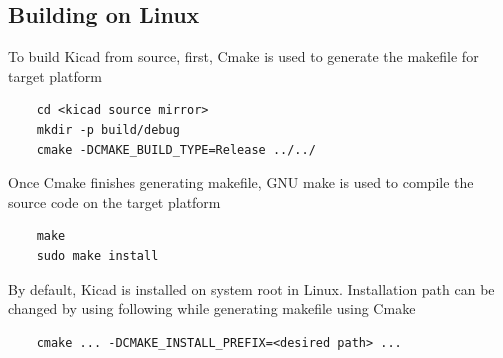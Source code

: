 \documentclass[12pt,a4paper]{report}
\begin{document}
\subsection{Building on Linux}
To build Kicad from source, first, Cmake is used to generate the makefile for target platform\\
\begin{verbatim}
    cd <kicad source mirror>
    mkdir -p build/debug
    cmake -DCMAKE_BUILD_TYPE=Release ../../
\end{verbatim}
Once Cmake finishes generating makefile, GNU make is used to compile the source code on the target platform\\
\begin{verbatim}
    make
    sudo make install
\end{verbatim}
By default, Kicad is installed on system root in Linux. Installation path can be changed by using following while generating makefile using Cmake\\
\begin{verbatim}
    cmake ... -DCMAKE_INSTALL_PREFIX=<desired path> ...
\end{verbatim}
\end{document}
